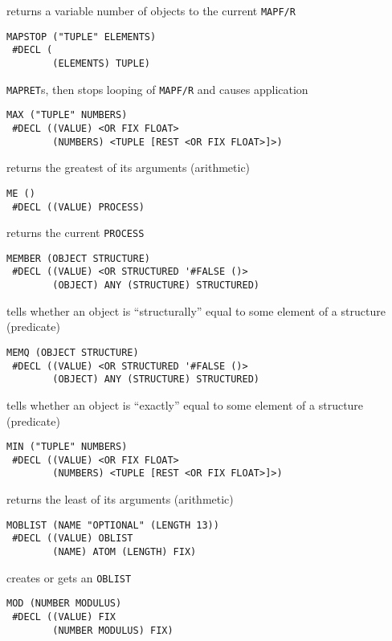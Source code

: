 \documentclass[a4paper,]{article}
\begin{document}
returns a variable number of objects to the current \texttt{MAPF/R}

\begin{verbatim}
MAPSTOP ("TUPLE" ELEMENTS)
 #DECL (
        (ELEMENTS) TUPLE)
\end{verbatim}

\texttt{MAPRET}s, then stops looping of \texttt{MAPF/R} and causes application

\begin{verbatim}
MAX ("TUPLE" NUMBERS)
 #DECL ((VALUE) <OR FIX FLOAT>
        (NUMBERS) <TUPLE [REST <OR FIX FLOAT>]>)
\end{verbatim}

returns the greatest of its arguments (arithmetic)

\begin{verbatim}
ME ()
 #DECL ((VALUE) PROCESS)
\end{verbatim}

returns the current \texttt{PROCESS}

\begin{verbatim}
MEMBER (OBJECT STRUCTURE)
 #DECL ((VALUE) <OR STRUCTURED '#FALSE ()>
        (OBJECT) ANY (STRUCTURE) STRUCTURED)
\end{verbatim}

tells whether an object is ``structurally'' equal to some element of a structure (predicate)

\begin{verbatim}
MEMQ (OBJECT STRUCTURE)
 #DECL ((VALUE) <OR STRUCTURED '#FALSE ()>
        (OBJECT) ANY (STRUCTURE) STRUCTURED)
\end{verbatim}

tells whether an object is ``exactly'' equal to some element of a structure (predicate)

\begin{verbatim}
MIN ("TUPLE" NUMBERS)
 #DECL ((VALUE) <OR FIX FLOAT>
        (NUMBERS) <TUPLE [REST <OR FIX FLOAT>]>)
\end{verbatim}

returns the least of its arguments (arithmetic)

\begin{verbatim}
MOBLIST (NAME "OPTIONAL" (LENGTH 13))
 #DECL ((VALUE) OBLIST
        (NAME) ATOM (LENGTH) FIX)
\end{verbatim}

creates or gets an \texttt{OBLIST}

\begin{verbatim}
MOD (NUMBER MODULUS)
 #DECL ((VALUE) FIX
        (NUMBER MODULUS) FIX)
\end{verbatim}
\end{document}

